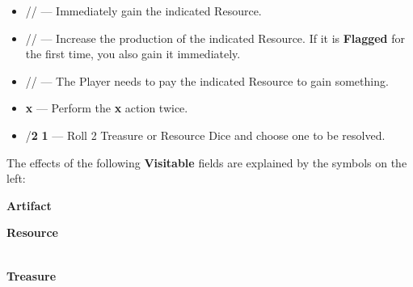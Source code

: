 \begin{multicols*}{2}
\medskip

\begin{itemize}[itemsep=0.4em]
  \item [{\LARGE\textbf{+}}]
    // —
    Immediately gain the indicated Resource.
  \item [{}]
    // —
    Increase the production of the indicated Resource.
    If it is \textbf{Flagged} for the first time, you also gain it immediately.
  \item [{}]
    //  —
    The Player needs to pay the indicated Resource to gain something.
  \item [{\LARGE\textbf{2}}] {\LARGE\textbf{x}} —
    Perform the {\LARGE\textbf{x}} action twice.
  \item [{\LARGE\textbf{2}}] /{\LARGE\textbf{2}}  {\LARGE\textbf{1}} —
    Roll 2 Treasure or Resource Dice and choose one to be resolved.
\end{itemize}

\columnbreak


The effects of the following \textbf{Visitable} \hypertarget{All Map Locations}{fields} are explained by the symbols on the left:

\medskip

{\centering
  \phantom{j}\textbf{Artifact}\\

  \bigskip

  \phantom{j}\textbf{Resource}\\
  \\

  \bigskip

  \phantom{j}\textbf{Treasure}\\
  \\
}
\end{multicols*}

